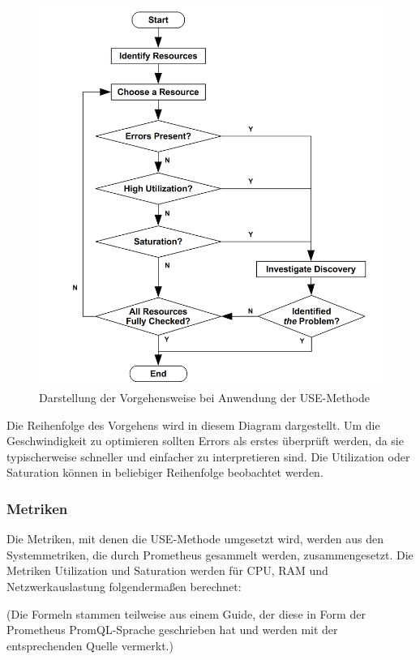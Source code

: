 \documentclass[a4paper,10pt]{scrartcl}
\begin{document}
\begin{figure}[htbp]
\includegraphics[scale=.7]{img/usemethod_flow.png}
\caption{Darstellung der Vorgehensweise bei Anwendung der USE-Methode ~\protect\cite{brendan-gregg-use}}
\end{figure}

Die Reihenfolge des Vorgehens wird in diesem Diagram dargestellt. Um die Geschwindigkeit zu optimieren sollten Errors als erstes überprüft werden, da sie typischerweise schneller und einfacher zu interpretieren sind. Die Utilization oder Saturation können in beliebiger Reihenfolge beobachtet werden.
\cite{brendan-gregg-use}

\pagebreak

\subsubsection{Metriken}

Die Metriken, mit denen die USE-Methode umgesetzt wird, werden aus den Systemmetriken, die durch Prometheus gesammelt werden, zusammengesetzt. 
Die Metriken Utilization und Saturation werden für CPU, RAM und Netzwerkauslastung folgendermaßen berechnet:

(Die Formeln stammen teilweise aus einem Guide, der diese in Form der Prometheus PromQL-Sprache geschrieben hat und werden mit der entsprechenden Quelle vermerkt.)
\end{document}
